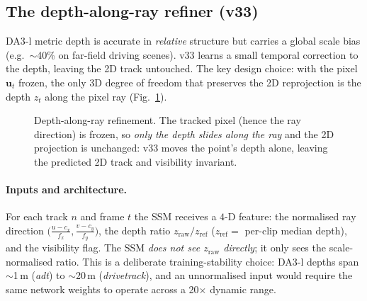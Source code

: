 \documentclass[11pt,a4paper]{article}
\begin{document}
\subsection{The depth-along-ray refiner (v33)}
\label{sec:v33}
DA3-l metric depth is accurate in \emph{relative} structure but carries a global scale bias
(e.g.\ $\sim$40\% on far-field driving scenes). v33 learns a small temporal correction to the
depth, leaving the 2D track untouched. The key design choice: with the pixel $\mathbf{u}_t$ frozen,
the only 3D degree of freedom that preserves the 2D reprojection is the depth $z_t$ along the pixel
ray (Fig.~\ref{fig:ray}).

\begin{figure}[h]
\centering
{}
\caption{Depth-along-ray refinement. The tracked pixel (hence the ray direction) is frozen, so
\emph{only the depth slides along the ray} and the 2D projection is unchanged: v33 moves the point's
depth alone, leaving the predicted 2D track and visibility invariant.}
\label{fig:ray}
\end{figure}

\paragraph{Inputs and architecture.} For each track $n$ and frame $t$ the SSM receives a $4$-D
feature: the normalised ray direction $\big(\tfrac{u-c_x}{f_x},\tfrac{v-c_y}{f_y}\big)$,
the depth ratio $z_{\text{raw}}/z_{\text{ref}}$ ($z_{\text{ref}}=$ per-clip median depth), and
the visibility flag.  The SSM \emph{does not see $z_{\text{raw}}$ directly}; it only sees the
scale-normalised ratio.  This is a deliberate training-stability choice: DA3-l depths span
$\sim$1\,m (\emph{adt}) to $\sim$20\,m (\emph{drivetrack}), and an unnormalised input would
require the same network weights to operate across a 20$\times$ dynamic range.
\end{document}
